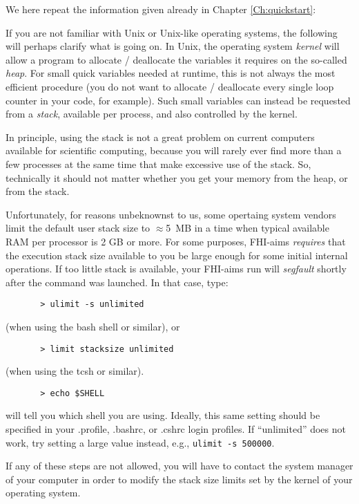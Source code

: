 We here repeat the information given already in Chapter \ref{Ch:quickstart}:

If you are not familiar with Unix or Unix-like operating systems, the
following will perhaps clarify what is going on. In Unix, the
operating system \emph{kernel} will allow a program to allocate /
deallocate the variables it requires on the so-called \emph{heap}. For
small quick variables needed at runtime, this is not always the most
efficient procedure (you do not want to allocate / deallocate every
single loop counter in your code, for example). Such small variables
can instead be requested from a \emph{stack}, available per process,
and also controlled by the kernel.

In principle, using the stack is not a great problem on current
computers available for scientific computing, because you will rarely
ever find more than a few processes at the same time that make
excessive use of the stack. So, technically it should not matter
whether you get your memory from the heap, or from the stack.

Unfortunately, for reasons unbeknownst to us, some opertaing system
vendors limit the  default user stack size to $\approx$5~MB in a time
when typical available RAM per processor is 2 GB or more.
For some purposes, FHI-aims \emph{requires} that the execution stack
size available to you be large enough for some initial internal
operations. If too little stack is available, your FHI-aims run will
\emph{segfault} shortly after the command was launched. In that case,
type:
    \begin{verbatim}
       > ulimit -s unlimited
    \end{verbatim}
    (when using the bash shell or similar), or
    \begin{verbatim}
       > limit stacksize unlimited
    \end{verbatim}
    (when using the tcsh or similar).
    \begin{verbatim}
       > echo $SHELL
    \end{verbatim}
will tell you which shell you are using. Ideally, this same setting should
be specified in your .profile, .bashrc, or .cshrc login profiles. If
``unlimited'' does not work, try setting a large value instead, e.g.,
\texttt{ulimit -s 500000}.

If any of these steps are not allowed, you will have to contact the
system manager of your computer in order to modify the stack size
limits set by the kernel of your operating system.

